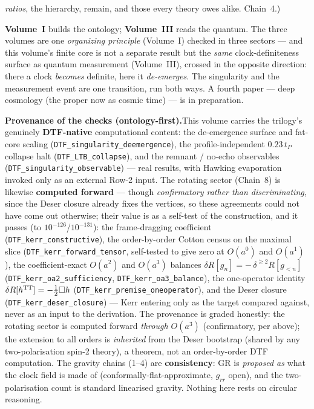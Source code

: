 \documentclass[11pt]{article}
\begin{document}
\begin{tcolorbox}
\begin{itemize}[leftmargin=1.5em,itemsep=2pt,topsep=3pt]
    \emph{ratios}, the hierarchy, remain, and those every theory owes alike. Chain~4.)
\end{itemize}
\noindent \textbf{Volume~I} builds the ontology; \textbf{Volume~III} reads the quantum. The three volumes
are one \emph{organizing principle} (Volume~I) checked in three sectors --- and this volume's finite core
is not a separate result but the \emph{same} clock-definiteness surface as quantum measurement
(Volume~III), crossed in the opposite direction: there a clock \emph{becomes} definite, here it
\emph{de-emerges}. The singularity and the measurement event are one transition, run both ways. A fourth
paper --- deep cosmology (the proper now as cosmic time) --- is in preparation.
\end{tcolorbox}

\begin{tcolorbox}
\textbf{Provenance of the checks (ontology-first).}\enspace This volume carries the trilogy's genuinely
\textbf{DTF-native} computational content: the de-emergence surface and fat-core scaling
(\texttt{DTF\_singularity\_deemergence}), the profile-independent $0.23\,t_P$ collapse halt
(\texttt{DTF\_LTB\_collapse}), and the remnant / no-echo observables
(\texttt{DTF\_singularity\_observable}) --- real results, with Hawking evaporation~\cite{Hawking1975}
invoked only as an external Row-2 input. The rotating sector (Chain~8) is likewise \textbf{computed forward}
--- though \emph{confirmatory rather than discriminating}, since the Deser closure already fixes the
vertices, so these agreements could not have come out otherwise; their value is as a self-test of the
construction, and it passes (to $10^{-126}$/$10^{-131}$): the frame-dragging coefficient (\texttt{DTF\_kerr\_constructive}), the order-by-order Cotton
census on the maximal slice (\texttt{DTF\_kerr\_forward\_tensor}, self-tested to give zero at $O(a^0)$ and
$O(a^1)$), the coefficient-exact $O(a^2)$ and $O(a^3)$ balances $\delta R[g_n]=-\,\delta^{\ge2}R[g_{<n}]$
(\texttt{DTF\_kerr\_oa2\_sufficiency}, \texttt{DTF\_kerr\_oa3\_balance}), the one-operator identity
$\delta R[h^{\rm TT}]=-\tfrac12\Box h$ (\texttt{DTF\_kerr\_premise\_oneoperator}), and the Deser closure
(\texttt{DTF\_kerr\_deser\_closure}) --- Kerr entering only as the target compared against, never as an
input to the derivation. The provenance is graded honestly: the rotating sector is computed
forward \emph{through $O(a^3)$} (confirmatory, per above); the extension to all orders is \emph{inherited} from the Deser bootstrap
(shared by any two-polarisation spin-2 theory), a theorem, not an order-by-order DTF computation. The
gravity chains (1--4) are \textbf{consistency}: GR is \emph{proposed as} what
the clock field is made of (conformally-flat-approximate, $g_{rr}$ open), and the two-polarisation count
is standard linearised gravity. Nothing here rests on circular reasoning.
\end{tcolorbox}
\end{document}
